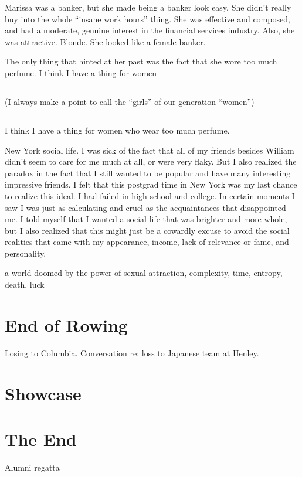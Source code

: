 \documentclass[12pt]{memoir}
\begin{document}
Marissa was a banker, but she made being a banker look easy.  She didn't really
buy into the whole ``insane work hours'' thing.  She was effective and composed,
and had a moderate, genuine interest in the financial services industry.  Also,
she was attractive.  Blonde.  She looked like a female banker. 

The only thing that hinted at her past was the fact that she wore too much
perfume.  I think I have a thing for women \section{} (I always make a point to call
the ``girls'' of our generation ``women'') \section{} I think I have a thing for women
who wear too much perfume.

New York social life.  I was sick of the fact that all of my friends besides
William didn't seem to care for me much at all, or were very flaky.  But I also
realized the paradox in the fact that I still wanted to be popular and have many
interesting impressive friends.  I felt that this postgrad time in New York was
my last chance to realize this ideal.  I had failed in high school and college.
In certain moments I saw I was just as calculating and cruel as the
acquaintances that disappointed me.  I told myself that I wanted a social life
that was brighter and more whole, but I also realized that this might just be a
cowardly excuse to avoid the social realities that came with my appearance,
income, lack of relevance or fame, and personality.

a world doomed by the power of sexual attraction, complexity, time, entropy,
death, luck

\chapter{End of Rowing}
Losing to Columbia.
Conversation re: loss to Japanese team at Henley.

\chapter{Showcase}


\chapter{The End}
Alumni regatta
\end{document}
